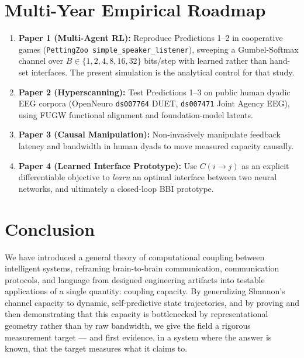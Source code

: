 \documentclass[11pt]{article}
\begin{document}
\section{Multi-Year Empirical Roadmap}
\label{sec:roadmap}
\begin{enumerate}[leftmargin=1.4em]
    \item \textbf{Paper 1 (Multi-Agent RL):} Reproduce Predictions 1--2 in cooperative games (\texttt{PettingZoo simple\_speaker\_listener}), sweeping a Gumbel-Softmax channel over $B \in \{1,2,4,8,16,32\}$ bits/step with learned rather than hand-set interfaces. The present simulation is the analytical control for that study.
    \item \textbf{Paper 2 (Hyperscanning):} Test Predictions 1--3 on public human dyadic EEG corpora (OpenNeuro \texttt{ds007764} DUET, \texttt{ds007471} Joint Agency EEG), using FUGW functional alignment and foundation-model latents.
    \item \textbf{Paper 3 (Causal Manipulation):} Non-invasively manipulate feedback latency and bandwidth in human dyads to move measured capacity causally.
    \item \textbf{Paper 4 (Learned Interface Prototype):} Use $C(i\!\to\!j)$ as an explicit differentiable objective to \emph{learn} an optimal interface between two neural networks, and ultimately a closed-loop BBI prototype.
\end{enumerate}

\section{Conclusion}
We have introduced a general theory of computational coupling between intelligent systems, reframing brain-to-brain communication, communication protocols, and language from designed engineering artifacts into testable applications of a single quantity: coupling capacity. By generalizing Shannon's channel capacity to dynamic, self-predictive state trajectories, and by proving and then demonstrating that this capacity is bottlenecked by representational geometry rather than by raw bandwidth, we give the field a rigorous measurement target --- and first evidence, in a system where the answer is known, that the target measures what it claims to.

\vspace{12pt}


\end{document}
